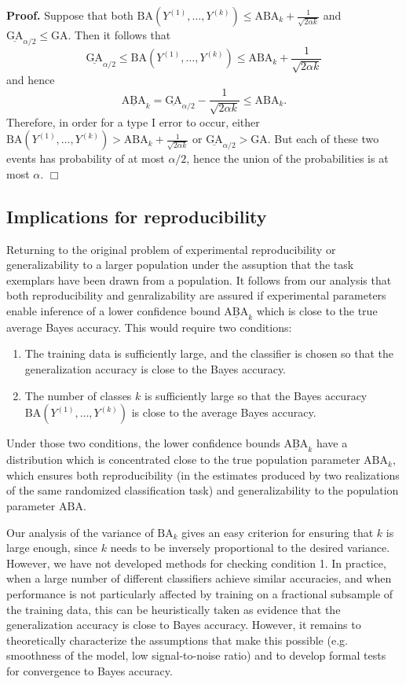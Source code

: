 \textbf{Proof.}
Suppose that both $\text{BA}(Y^{(1)},\hdots,
Y^{(k)}) \leq \text{ABA}_k + \frac{1}{\sqrt{2\alpha k}}$ and
$\underline{\text{GA}}_{\alpha/2} \leq \text{GA}.$
Then it follows that
\[
\underline{\text{GA}}_{\alpha/2} \leq \text{BA}(Y^{(1)},\hdots,
Y^{(k)}) \leq \text{ABA}_k + \frac{1}{\sqrt{2\alpha k}}
\]
and hence
\[
\underline{\text{ABA}}_k = \underline{\text{GA}}_{\alpha/2} -  \frac{1}{\sqrt{2\alpha k}} \leq \text{ABA}_k.
\]
Therefore, in order for a type I error to occur, either
$\text{BA}(Y^{(1)},\hdots, Y^{(k)}) > \text{ABA}_k
+ \frac{1}{\sqrt{2\alpha k}}$ or $\underline{\text{GA}}_{\alpha/2}
> \text{GA}.$ But each of these two events has probability of at most
$\alpha/2$, hence the union of the probabilities is at most
$\alpha$. $\Box$

\subsection{Implications for reproducibility}

Returning to the original problem of experimental reproducibility or
generalizability to a larger population under the assuption that the
task exemplars have been drawn from a population.  It follows
from our analysis that both reproducibility and genralizability are
assured if experimental parameters enable inference of a lower
confidence bound $\underline{\text{ABA}}_k$ which is close to the true
average Bayes accuracy.  This would require two conditions:
\begin{enumerate}
\item The training data is sufficiently large, and the classifier is
  chosen so that the generalization accuracy is close to the Bayes
  accuracy.
\item The number of classes $k$ is sufficiently large so that the
  Bayes accuracy $\text{BA}(Y^{(1)},\hdots, Y^{(k)})$ is close to the
  average Bayes accuracy.
\end{enumerate}
Under those two conditions, the lower confidence bounds
$\underline{\text{ABA}}_k$ have a distribution which is concentrated
close to the true population parameter $\text{ABA}_k$, which ensures
both reproducibility (in the estimates produced by two realizations of
the same randomized classification task) and generalizability to the
population parameter $\text{ABA}$.

Our analysis of the variance of $\text{BA}_k$ gives an easy criterion
for ensuring that $k$ is large enough, since $k$ needs to be inversely
proportional to the desired variance.  However, we have not developed
methods for checking condition 1.  In practice, when a large number of
different classifiers achieve similar accuracies, and when performance
is not particularly affected by training on a fractional subsample of
the training data, this can be heuristically taken as evidence that the
generalization accuracy is close to Bayes accuracy.  However, it
remains to theoretically characterize the assumptions that make this
possible (e.g. smoothness of the model, low signal-to-noise ratio) and
to develop formal tests for convergence to Bayes accuracy.

